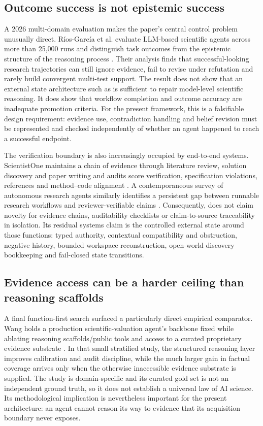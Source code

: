 \subsection{Outcome success is not epistemic success}

A 2026 multi-domain evaluation makes the paper's central control problem unusually direct. R\'ios-Garc\'ia et al. evaluate LLM-based scientific agents across more than 25,000 runs and distinguish task outcomes from the epistemic structure of the reasoning process \cite{riosgarcia2026}. Their analysis finds that successful-looking research trajectories can still ignore evidence, fail to revise under refutation and rarely build convergent multi-test support. The result does not show that an external state architecture such as \RAKL{} is sufficient to repair model-level scientific reasoning. It does show that workflow completion and outcome accuracy are inadequate promotion criteria. For the present framework, this is a falsifiable design requirement: evidence use, contradiction handling and belief revision must be represented and checked independently of whether an agent happened to reach a successful endpoint.

The verification boundary is also increasingly occupied by end-to-end systems. ScientistOne maintains a chain of evidence through literature review, solution discovery and paper writing and audits score verification, specification violations, references and method--code alignment \cite{meng2026scientistone}. A contemporaneous survey of autonomous research agents similarly identifies a persistent gap between runnable research workflows and reviewer-verifiable claims \cite{ding2026verificationgap}. Consequently, \RAKL{} does not claim novelty for evidence chains, auditability checklists or claim-to-source traceability in isolation. Its residual systems claim is the controlled external state around those functions: typed authority, contextual compatibility and obstruction, negative history, bounded workspace reconstruction, open-world discovery bookkeeping and fail-closed state transitions.

\subsection{Evidence access can be a harder ceiling than reasoning scaffolds}

A final function-first search surfaced a particularly direct empirical comparator. Wang holds a production scientific-valuation agent's backbone fixed while ablating reasoning scaffolds/public tools and access to a curated proprietary evidence substrate \cite{wang2026evidence}. In that small stratified study, the structured reasoning layer improves calibration and audit discipline, while the much larger gain in factual coverage arrives only when the otherwise inaccessible evidence substrate is supplied. The study is domain-specific and its curated gold set is not an independent ground truth, so it does not establish a universal law of AI science. Its methodological implication is nevertheless important for the present architecture: an agent cannot reason its way to evidence that its acquisition boundary never exposes.

